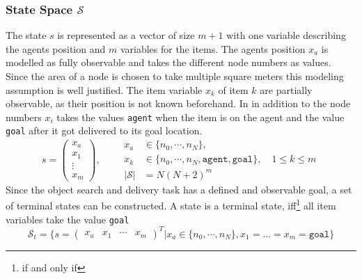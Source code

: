 \subsubsection{State Space $\mathcal{S}$}
The state $s$ is represented as a vector of size $m+1$ with one variable describing the agents position and $m$ variables for the items. The agents position $x_a$ is modelled as fully observable and takes the different node numbers as values. Since the area of a node is chosen to take multiple square meters this modeling assumption is well justified. The item variable $x_k$ of item $k$ are partially observable, as their position is not known beforehand. In in addition to the node numbers $x_i$ takes the values \texttt{agent} when the item is on the agent and the value \texttt{goal} after it got delivered to its goal location.
\begin{equation}
    s=\begin{pmatrix} x_a \\ x_1 \\ \vdots \\ x_m \end{pmatrix}, \qquad \begin{aligned} x_a&\in\{n_0, \cdots, n_N\},\\ 
    x_k &\in \{n_0, \cdots, n_N, \texttt{agent}, \texttt{goal}\}, \quad 1 \leq k \leq m \\
    |\mathcal{S}| &= N(N+2)^m \end{aligned}
\end{equation}
Since the object search and delivery task has a defined and observable goal, a set of terminal states can be constructed. A state is a terminal state, iff\footnote{if and only if} all item variables take the value \texttt{goal}
\begin{equation}\label{eq:s_t}
    \mathcal{S}_t = \{s=\begin{pmatrix} x_a & x_1 & \cdots & x_m \end{pmatrix}^T | x_a\in \{n_0, \cdots, n_N\}, x_1=\ldots=x_m=\texttt{goal}\}
\end{equation}
